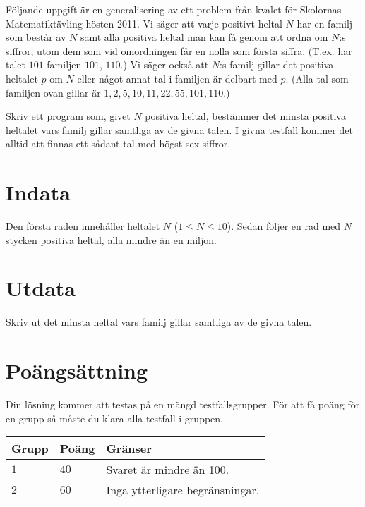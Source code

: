Följande uppgift är en generalisering av ett problem från kvalet för Skolornas Matematiktävling hösten 2011. Vi säger att varje positivt heltal $N$ har en familj som består av $N$ samt alla positiva heltal man kan få genom att ordna om $N$:s siffror, utom dem som vid omordningen får en nolla som första siffra. (T.ex. har talet $101$ familjen $101$, $110$.) Vi säger också att $N$:s familj gillar det positiva heltalet $p$ om $N$ eller något annat tal i familjen är delbart med $p$. (Alla tal som familjen ovan gillar är $1,2,5,10,11,22,55,101,110$.)

Skriv ett program som, givet $N$ positiva heltal, bestämmer det minsta positiva heltalet vars familj gillar samtliga av de givna talen. I givna testfall kommer det alltid att finnas ett sådant tal med högst sex siffror.  
\section*{Indata}
Den första raden innehåller heltalet $N$ ($1\leq N \leq 10$). Sedan följer en rad med $N$ stycken positiva heltal, alla mindre än en miljon.

\section*{Utdata}
Skriv ut det minsta heltal vars familj gillar samtliga av de givna talen.

\section*{Poängsättning}
Din lösning kommer att testas på en mängd testfallsgrupper.
För att få poäng för en grupp så måste du klara alla testfall i gruppen.

\noindent
\begin{tabular}{| l | l | p{12cm} |}
  \hline
  \textbf{Grupp} & \textbf{Poäng} & \textbf{Gränser} \\ \hline
  $1$    & $40$          & Svaret är mindre än 100.  \\ \hline
  $2$    & $60$          & Inga ytterligare begränsningar.  \\ \hline
\end{tabular}
